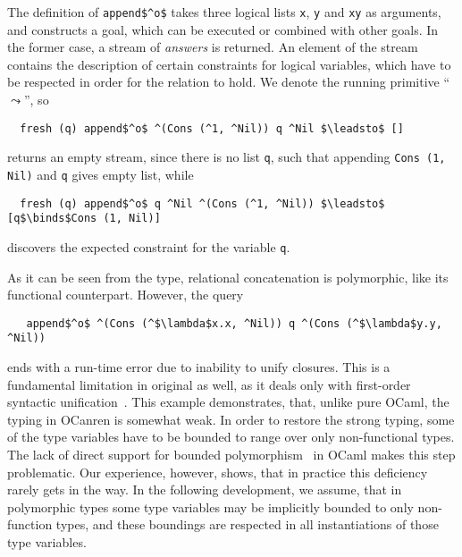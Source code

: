 The definition of \lstinline{append$^o$} takes three logical lists \lstinline{x}, \lstinline{y} and \lstinline{xy} as arguments, and constructs a goal,
which can be executed or combined with other goals. In the former case, a stream of \emph{answers} is returned. An element of the stream contains the description
of certain constraints for logical variables, which have to be respected in order for the relation to hold. We denote the running primitive ``$\leadsto$'', so

\begin{lstlisting}
  fresh (q) append$^o$ ^(Cons (^1, ^Nil)) q ^Nil $\leadsto$ []
\end{lstlisting}

\noindent returns an empty stream, since there is no list \lstinline{q}, such that appending \lstinline{Cons (1, Nil)} and \lstinline{q} gives empty list, while

\begin{lstlisting}
  fresh (q) append$^o$ q ^Nil ^(Cons (^1, ^Nil)) $\leadsto$ [q$\binds$Cons (1, Nil)]
\end{lstlisting}

\noindent discovers the expected constraint for the variable \lstinline{q}.

As it can be seen from the type, relational concatenation is polymorphic, like its functional counterpart. However, the query

\begin{lstlisting}
   append$^o$ ^(Cons (^$\lambda$x.x, ^Nil)) q ^(Cons (^$\lambda$y.y, ^Nil))  
\end{lstlisting}

\noindent ends with a run-time error due to inability to unify closures. This is a fundamental limitation in original \miniKanren as well, as it deals only with first-order syntactic unification~\cite{Unification}. This example demonstrates, that, unlike pure OCaml, the typing in OCanren is somewhat weak. In order to restore the strong typing, some of the type variables have to be bounded to range over only non-functional types. The lack of direct support for bounded polymorphism~\cite{cardelli} in OCaml makes this step problematic. Our experience, however, shows, that in practice this deficiency rarely gets in the way. In the following development, we assume, that in polymorphic types some type variables may be implicitly bounded to only non-function types, and these boundings are respected in all instantiations of those type variables.

